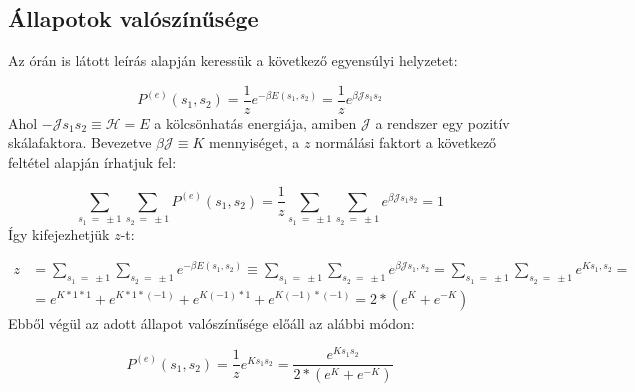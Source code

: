 \section{} \label{sec:2}

\subsection{Állapotok valószínűsége}
Az órán is látott leírás alapján keressük a következő egyensúlyi helyzetet:

\begin{equation}
    P^{\left( e \right)} \left( s_{1}, s_{2} \right)
    =
    \frac{1}{z} e^{- \beta E \left( s_{1}, s_{2} \right)}
    =
    \frac{1}{z} e^{\beta \mathcal{J} s_{1} s_{2}}
\end{equation}
Ahol $- \mathcal{J} s_{1} s_{2} \equiv \mathscr{H} = E$ a kölcsönhatás energiája, amiben $\mathcal{J}$ a rendszer egy pozitív skálafaktora. Bevezetve $\beta \mathcal{J} \equiv K$ mennyiséget, a $z$ normálási faktort a következő feltétel alapján írhatjuk fel:

\begin{equation}
    \sum_{s_{1}\ =\ \pm 1} \sum_{s_{2}\ =\ \pm 1} P^{\left( e \right)} \left( s_{1}, s_{2} \right)
    =
    \frac{1}{z} \sum_{s_{1}\ =\ \pm 1} \sum_{s_{2}\ =\ \pm 1} e^{\beta \mathcal{J} s_{1} s_{2}}
    =
    1
\end{equation}
Így kifejezhetjük $z$-t:

\begin{align}
    z
    &=
    \sum_{s_{1}\ =\ \pm 1} \sum_{s_{2}\ =\ \pm 1} e^{- \beta E \left( s_{1}, s_{2} \right)}
    \equiv
    \sum_{s_{1}\ =\ \pm 1} \sum_{s_{2}\ =\ \pm 1} e^{\beta \mathcal{J} s_{1}, s_{2}}
    =
    \sum_{s_{1}\ =\ \pm 1} \sum_{s_{2}\ =\ \pm 1} e^{K s_{1}, s_{2}}
    = \nonumber \\
    &=
    e^{K * 1 * 1} + e^{K * 1 * \left( -1 \right)} + e^{K \left( -1 \right) * 1} + e^{K \left( -1 \right) * \left( -1 \right)}
    =
    2 * \left( e^{K} + e^{-K} \right)
\end{align}
Ebből végül az adott állapot valószínűsége előáll az alábbi módon:

\begin{equation}
    P^{\left( e \right)} \left( s_{1}, s_{2} \right)
    =
    \frac{1}{z} e^{K s_{1} s_{2}}
    =
    \frac{e^{K s_{1} s_{2}}}{2 * \left( e^{K} + e^{-K} \right)}
\end{equation}